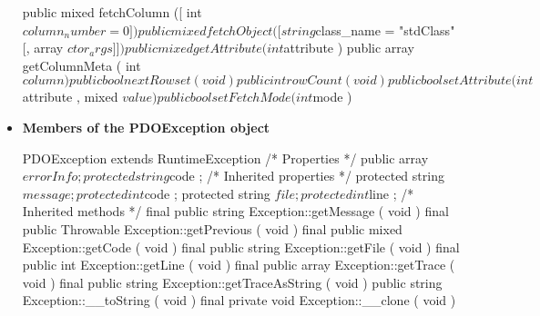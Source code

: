 \documentclass{report}
\begin{document}
\begin{itemize}
\begin{cppcode}
{                public mixed fetchColumn ([ int $column_number = 0 ] )
                public mixed fetchObject ([ string $class_name = "stdClass" [, array $ctor_args ]] )
                public mixed getAttribute ( int $attribute )
                public array getColumnMeta ( int $column )
                public bool nextRowset ( void )
                public int rowCount ( void )
                public bool setAttribute ( int $attribute , mixed $value )
                public bool setFetchMode ( int $mode )
            }
            \end{cppcode}
        \item \textbf{Members of the PDOException object}
            \bigbreak \noindent 
            \begin{cppcode}
                PDOException extends RuntimeException {
                    /* Properties */
                    public array $errorInfo ;
                    protected string $code ;
                    /* Inherited properties */
                    protected string $message ;
                    protected int $code ;
                    protected string $file ;
                    protected int $line ;
                    /* Inherited methods */
                    final public string Exception::getMessage ( void )
                    final public Throwable Exception::getPrevious ( void )
                    final public mixed Exception::getCode ( void )
                    final public string Exception::getFile ( void )
                    final public int Exception::getLine ( void )
                    final public array Exception::getTrace ( void )
                    final public string Exception::getTraceAsString ( void )
                    public string Exception::__toString ( void )
                    final private void Exception::__clone ( void )
                }
            \end{cppcode}




    \end{itemize}

    \pagebreak 
\end{document}

